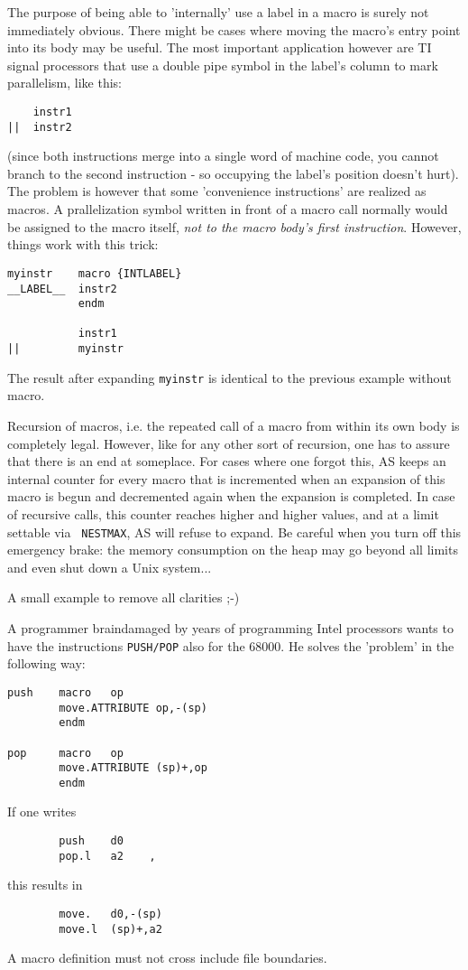 \documentclass[12pt,twoside]{report}
\newcommand{\tty}[1]{{\tt #1}}
\begin{document}
The purpose of being able to 'internally' use a label in a macro is surely
not immediately obvious.  There might be cases where moving the macro's
entry point into its body may be useful.  The most important application
however are TI signal processors that use a double pipe symbol in the
label's column to mark parallelism, like this:
\begin{verbatim}
    instr1
||  instr2
\end{verbatim}
(since both instructions merge into a single word of machine code, you
cannot branch to the second instruction - so occupying the label's
position doesn't hurt).  The problem is however that some 'convenience
instructions' are realized as macros.  A prallelization symbol written in
front of a macro call normally would be assigned to the macro itself, {\it
not to the macro body's first instruction}.  However, things work with
this trick:
\begin{verbatim}
myinstr    macro {INTLABEL}
__LABEL__  instr2
           endm  

           instr1
||         myinstr
\end{verbatim}
The result after expanding {\tt myinstr} is identical to the previous
example without macro.

Recursion of macros, i.e. the repeated call of a macro from within its own
body is completely legal.  However, like for any other sort of recursion,
one has to assure that there is an end at someplace.  For cases where one
forgot this, AS keeps an internal counter for every macro that is
incremented when an expansion of this macro is begun and decremented again
when the expansion is completed.  In case of recursive calls, this counter
reaches higher and higher values, and at a limit settable via {\tt
NESTMAX}, AS will refuse to expand. Be careful when you turn off this
emergency brake: the memory consumption on the heap may go beyond all
limits and even shut down a Unix system...

A small example to remove all clarities ;-)

A programmer braindamaged by years of programming Intel processors
wants to have the instructions \tty{PUSH/POP} also for the 68000.  He
solves the 'problem' in the following way:
\begin{verbatim}
push    macro   op
        move.ATTRIBUTE op,-(sp)
        endm

pop     macro   op
        move.ATTRIBUTE (sp)+,op
        endm
\end{verbatim}
If one writes
\begin{verbatim}
        push    d0
        pop.l   a2    ,
\end{verbatim}
this results in
\begin{verbatim}
        move.   d0,-(sp)
        move.l  (sp)+,a2
\end{verbatim}
A macro definition must not cross include file boundaries.
\end{document}
